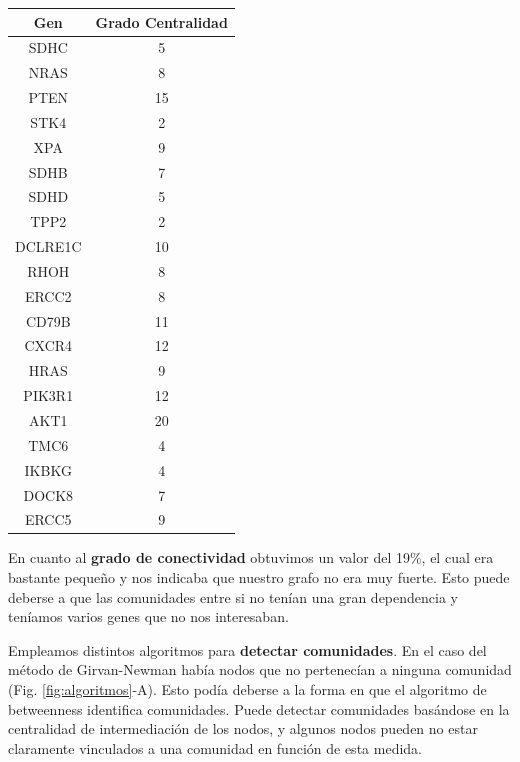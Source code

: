 \begin{table}[h]
\begin{minipage}{0.5\textwidth}
			\centering
			\begin{tabular}{|c|c|}
				\hline
				Gen & Grado Centralidad \\
				\hline
				SDHC & 5\\
				\hline
				NRAS & 8 \\
				\hline
				PTEN & 15 \\
				\hline
				STK4 & 2 \\
				\hline
				XPA & 9 \\
				\hline
				SDHB & 7 \\
				\hline
				SDHD & 5 \\
				\hline
				TPP2 & 2 \\
				\hline
				DCLRE1C & 10 \\
				\hline
				RHOH & 8 \\
				\hline
				ERCC2 & 8 \\
				\hline
				CD79B & 11 \\
				\hline
				CXCR4 & 12 \\
				\hline
				HRAS & 9 \\
				\hline
				PIK3R1 & 12 \\
				\hline
				AKT1 & 20 \\
				\hline
				TMC6 & 4 \\
				\hline
				IKBKG & 4 \\
				\hline
				DOCK8 & 7 \\
				\hline
				ERCC5 & 9 \\
				\hline
			\end{tabular}
			
			
		\end{minipage}
	\end{table}
	



\vspace{3pt}

En cuanto al \textbf{grado de conectividad} obtuvimos un valor del 19\%, el cual era bastante pequeño y nos indicaba que nuestro grafo no era muy fuerte. Esto puede deberse a que las comunidades entre si no tenían una gran dependencia y teníamos varios genes que no nos interesaban. 

\vspace{3pt}

Empleamos distintos algoritmos para \textbf{detectar comunidades}. En el caso del método de Girvan-Newman había nodos que no pertenecían a ninguna comunidad (Fig. \ref{fig:algoritmos}-A). Esto podía deberse a la forma en que el algoritmo de betweenness identifica comunidades. Puede detectar comunidades basándose en la centralidad de intermediación de los nodos, y algunos nodos pueden no estar claramente vinculados a una comunidad en función de esta medida.

